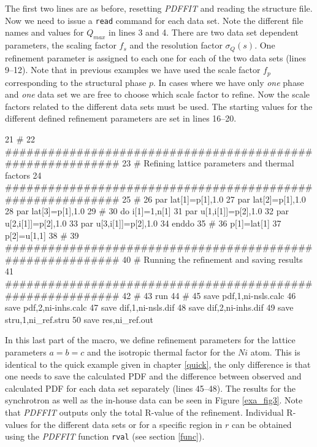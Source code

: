\noindent The first two lines are as before, resetting {\it
PDFFIT} and reading the structure file. Now we need to issue a
{\tt read} command for each data set. Note the different file
names and values for $Q_{max}$ in lines 3 and 4. There are two
data set dependent parameters, the scaling factor $f_{s}$ and the
resolution factor $\sigma_{Q}(s)$. One refinement parameter is
assigned to each one for each of the two data sets (lines 9--12).
Note that in previous examples we have used the scale factor
$f_{p}$ corresponding to the structural phase $p$. In cases where
we have only {\it one} phase and {\it one} data set we are free to
choose which scale factor to refine. Now the scale factors related
to the different data sets must be used. The starting values for
the different defined refinement parameters are set in lines
16--20.

\footnotesize
\begin{MacVerbatim}
     21 #
     22 ###########################################################
     23 # Refining lattice parameters and thermal factors
     24 ###########################################################
     25 #
     26 par lat[1]=p[1],1.0
     27 par lat[2]=p[1],1.0
     28 par lat[3]=p[1],1.0
     29 #
     30 do i[1]=1,n[1]
     31   par u[1,i[1]]=p[2],1.0
     32   par u[2,i[1]]=p[2],1.0
     33   par u[3,i[1]]=p[2],1.0
     34 enddo
     35 #
     36 p[1]=lat[1]
     37 p[2]=u[1,1]
     38 #
     39 ###########################################################
     40 # Running the refinement and saving results
     41 ###########################################################
     42 #
     43 run
     44 #
     45 save pdf,1,ni-nsls.calc
     46 save pdf,2,ni-inhs.calc
     47 save dif,1,ni-nsls.dif
     48 save dif,2,ni-inhs.dif
     49 save stru,1,ni_ref.stru
     50 save res,ni_ref.out
\end{MacVerbatim}
\normalsize

\noindent In this last part of the macro, we define refinement
parameters for the lattice parameters $a=b=c$ and the isotropic
thermal factor for the $Ni$ atom. This is identical to the quick
example given in chapter \ref{quick}, the only difference is that
one needs to save the calculated PDF and the difference between
observed and calculated PDF for each data set separately (lines
45--48). The results for the synchrotron as well as the in-house
data can be seen in Figure \ref{exa_fig3}. Note that {\it PDFFIT}
outputs only the total R-value of the refinement. Individual
R-values for the different data sets or for a specific region in
$r$ can be obtained using the {\it PDFFIT} function {\tt rval}
(see section \ref{func}).

